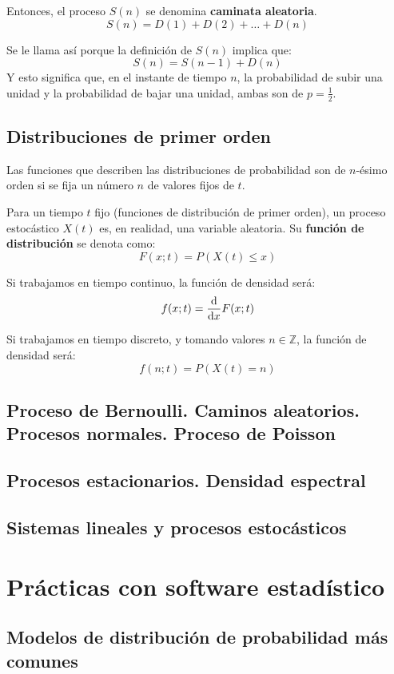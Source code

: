 \documentclass[a4paper]{book}
\begin{document}
Entonces, el proceso $S(n)$ se denomina \textbf{caminata aleatoria}.
\[ S(n) = D(1)+D(2)+\dots +D(n) \]

Se le llama así porque la definición de $S(n)$ implica que:
\[ S(n) = S(n-1) + D(n) \]
Y esto significa que, en el instante de tiempo $n$, la probabilidad de subir una unidad y la probabilidad de bajar una unidad, ambas son de $p=\frac{1}{2}$. 

\section{Distribuciones de primer orden}

Las funciones que describen las distribuciones de probabilidad son de $n$-ésimo orden si se fija un número $n$ de valores fijos de $t$.

Para un tiempo $t$ fijo (funciones de distribución de primer orden), un proceso estocástico $X(t)$ es, en realidad, una variable aleatoria. Su \textbf{función de distribución} se denota como:
\[ F \left( x;t \right) = P \left( X(t) \leq x \right) \]

Si trabajamos en tiempo continuo, la función de densidad será:
\[ f(x;t) = \dv{}{x} F(x;t) \]

Si trabajamos en tiempo discreto, y tomando valores $n\in \mathbb{Z}$, la función de densidad será:
\[ f \left( n;t \right) = P \left( X(t) = n \right) \]


\section{Proceso de Bernoulli. Caminos aleatorios. Procesos normales. Proceso de Poisson}

\section{Procesos estacionarios. Densidad espectral}

\section{Sistemas lineales y procesos estocásticos}

\chapter{Prácticas con software estadístico}


\section{Modelos de distribución de probabilidad más comunes}
\end{document}
